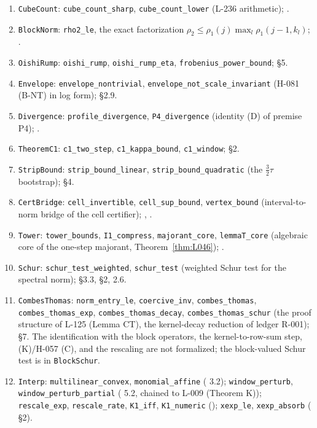 \begin{itemize}
\begin{enumerate}
\item \texttt{CubeCount}: \texttt{cube\_count\_sharp}, \texttt{cube\_count\_lower} (L-236 arithmetic); .
\item \texttt{BlockNorm}: \texttt{rho2\_le}, the exact factorization $\rho_2\le\rho_1(j)\max_l\rho_1(j-1,k_l)$; .
\item \texttt{OishiRump}: \texttt{oishi\_rump}, \texttt{oishi\_rump\_eta}, \texttt{frobenius\_power\_bound};  \S5.
\item \texttt{Envelope}: \texttt{envelope\_nontrivial}, \texttt{envelope\_not\_scale\_invariant} (H-081 (B-NT) in log form);  \S2.9.
\item \texttt{Divergence}: \texttt{profile\_divergence}, \texttt{P4\_divergence} (identity (D) of premise P4); .
\item \texttt{TheoremC1}: \texttt{c1\_two\_step}, \texttt{c1\_kappa\_bound}, \texttt{c1\_window};  \S2.
\item \texttt{StripBound}: \texttt{strip\_bound\_linear}, \texttt{strip\_bound\_quadratic} (the $\tfrac32\tau$ bootstrap);  \S4.
\item \texttt{CertBridge}: \texttt{cell\_invertible}, \texttt{cell\_sup\_bound}, \texttt{vertex\_bound} (interval-to-norm bridge of the cell certifier); , .
\item \texttt{Tower}: \texttt{tower\_bounds}, \texttt{I1\_compress}, \texttt{majorant\_core}, \texttt{lemmaT\_core} (algebraic core of the one-step majorant, Theorem~\ref{thm:L046}); .
\item \texttt{Schur}: \texttt{schur\_test\_weighted}, \texttt{schur\_test} (weighted Schur test for the spectral norm);  \S3.3,  \S2,  2.6.
\item \texttt{CombesThomas}: \texttt{norm\_entry\_le}, \texttt{coercive\_inv}, \texttt{combes\_thomas}, \texttt{combes\_thomas\_exp}, \texttt{combes\_thomas\_decay}, \texttt{combes\_thomas\_schur} (the proof structure of L-125 (Lemma CT), the kernel-decay reduction of ledger R-001);  \S7. The identification with the block operators, the kernel-to-row-sum step, (K)/H-057 (C), and the rescaling are not formalized; the block-valued Schur test is in \texttt{BlockSchur}.
\item \texttt{Interp}: \texttt{multilinear\_convex}, \texttt{monomial\_affine} ( 3.2); \texttt{window\_perturb}, \texttt{window\_perturb\_partial} ( 5.2, chained to L-009 (Theorem K)); \texttt{rescale\_exp}, \texttt{rescale\_rate}, \texttt{K1\_iff}, \texttt{K1\_numeric} (); \texttt{xexp\_le}, \texttt{xexp\_absorb} ( \S2).

\end{enumerate}
\end{itemize}

